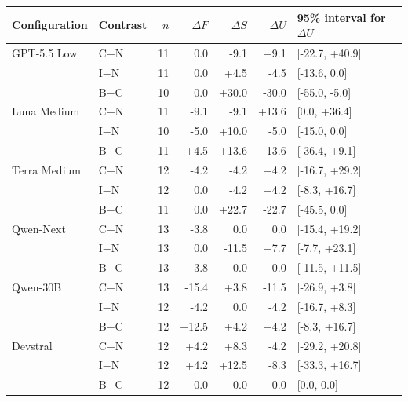 \begin{tabular}{llrrrrl}
\toprule
Configuration & Contrast & $n$ & $\Delta F$ & $\Delta S$ & $\Delta U$ & 95\% interval for $\Delta U$\\
\midrule
GPT-5.5 Low & C$-$N & 11 & 0.0 & -9.1 & +9.1 & [-22.7, +40.9]\\
 & I$-$N & 11 & 0.0 & +4.5 & -4.5 & [-13.6, 0.0]\\
 & B$-$C & 10 & 0.0 & +30.0 & -30.0 & [-55.0, -5.0]\\
\addlinespace[2pt]
Luna Medium & C$-$N & 11 & -9.1 & -9.1 & +13.6 & [0.0, +36.4]\\
 & I$-$N & 10 & -5.0 & +10.0 & -5.0 & [-15.0, 0.0]\\
 & B$-$C & 11 & +4.5 & +13.6 & -13.6 & [-36.4, +9.1]\\
\addlinespace[2pt]
Terra Medium & C$-$N & 12 & -4.2 & -4.2 & +4.2 & [-16.7, +29.2]\\
 & I$-$N & 12 & 0.0 & -4.2 & +4.2 & [-8.3, +16.7]\\
 & B$-$C & 11 & 0.0 & +22.7 & -22.7 & [-45.5, 0.0]\\
\addlinespace[2pt]
Qwen-Next & C$-$N & 13 & -3.8 & 0.0 & 0.0 & [-15.4, +19.2]\\
 & I$-$N & 13 & 0.0 & -11.5 & +7.7 & [-7.7, +23.1]\\
 & B$-$C & 13 & -3.8 & 0.0 & 0.0 & [-11.5, +11.5]\\
\addlinespace[2pt]
Qwen-30B & C$-$N & 13 & -15.4 & +3.8 & -11.5 & [-26.9, +3.8]\\
 & I$-$N & 12 & -4.2 & 0.0 & -4.2 & [-16.7, +8.3]\\
 & B$-$C & 12 & +12.5 & +4.2 & +4.2 & [-8.3, +16.7]\\
\addlinespace[2pt]
Devstral & C$-$N & 12 & +4.2 & +8.3 & -4.2 & [-29.2, +20.8]\\
 & I$-$N & 12 & +4.2 & +12.5 & -8.3 & [-33.3, +16.7]\\
 & B$-$C & 12 & 0.0 & 0.0 & 0.0 & [0.0, 0.0]\\
\bottomrule
\end{tabular}
